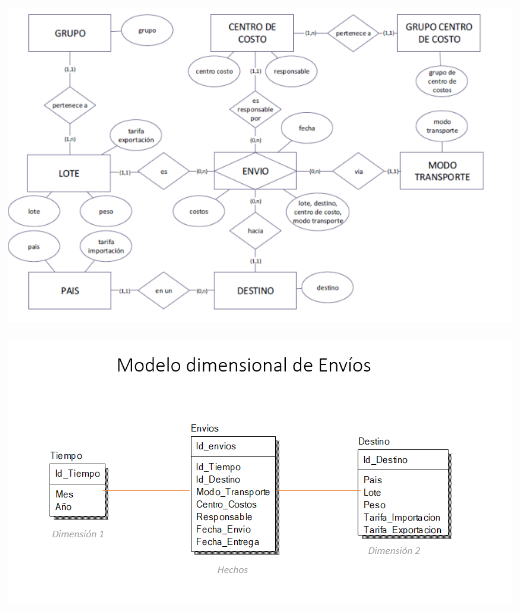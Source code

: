 \begin{center}
\includegraphics[width=15cm]{./Imagenes/diagrama1}
\end{center}

\begin{center}
\includegraphics[width=15cm]{./Imagenes/dimension1}
\end{center}

\newpage

